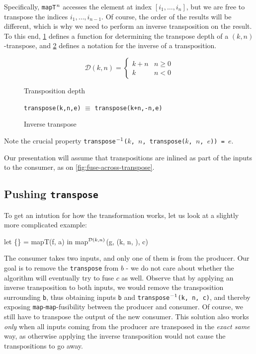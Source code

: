 Specifically, \texttt{mapT$^{n}$} accesses the element at index
\([i_{1}, \ldots, i_{n}]\), but we are free to transpose the indices
$i_{1}, \ldots, i_{n-1}$.  Of course, the order of the results will be
different, which is why we need to perform an inverse transposition on
the result.  To this end, \cref{fig:depth-of-transpose} defines a
function for determining the transpose depth of a $(k,n)$-transpose,
and \cref{fig:inverse-transpose} defines a notation for the inverse of
a transposition.

\begin{figure}
\begin{center}
  \[
  \mathcal{D}(k,n) =
  \begin{cases}
    k+n & n \geq 0\\
    k   & n < 0
  \end{cases}
  \]
\end{center}
\caption{Transposition depth}
\label{fig:depth-of-transpose}
\end{figure}
\begin{figure}
\begin{center}
\texttt{transpose(k,n,e)} $\equiv$ \texttt{transpose(k+n,-n,e)}
\end{center}
\caption{Inverse transpose}
\label{fig:inverse-transpose}
\end{figure}

Note the crucial property \texttt{transpose\(^{-1}\)($k$, $n$,
  transpose($k$, $n$, $e$))~=~$e$}.

Our presentation will assume that transpositions are inlined as part
of the inputs to the consumer, as on \cref{fig:fuse-across-transpose}.

\subsection{Pushing \texttt{transpose}}

To get an intution for how the transformation works, let us look at a
slightly more complicated example:

\begin{colorcode}
let \{\} = mapT(f, a) in
map\(^{\mathcal{D}(k,n)}\)(g, (k, n, ), c)
\end{colorcode}

The consumer takes two inputs, and only one of them is from the
producer.  Our goal is to remove the \texttt{transpose} from $b$ - we
do not care about whether the algorithm will eventually try to fuse
$c$ as well.  Observe that by applying an inverse transposition to
both inputs, we would remove the transposition surrounding \texttt{b},
thus obtaining inputs \texttt{b} and
\texttt{transpose\(^{-1}\)(k, n, c)}, and thereby exposing
\texttt{map}-\texttt{map}-fusibility between the producer and
consumer.  Of course, we still have to transpose the output of the new
consumer.  This solution also works \textit{only} when all inputs
coming from the producer are transposed in the \textit{exact same}
way, as otherwise applying the inverse transposition would not cause
the transpositions to go away.


